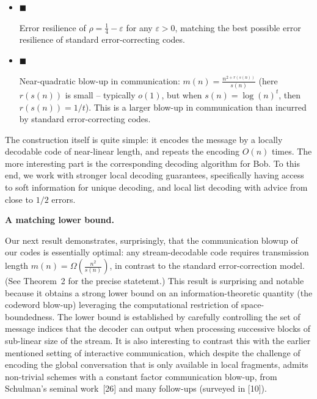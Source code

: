 \begin{itemize}


\item[] 
$\blacksquare$ 


Error resilience of $\rho=\frac{1}{4}-\varepsilon$ for any $\varepsilon>0$, matching the best possible error resilience of standard error-correcting codes.\par





\item[] 
$\blacksquare$ 


Near-quadratic blow-up in communication: $m(n)=\frac{n^{2+r(s(n))}}{s(n)}$ (here $r(s(n))$ is small – typically $o(1)$, but when $s(n)=\log(n)^{t}$, then $r(s(n))=1/t$). This is a larger blow-up in communication than incurred by standard error-correcting codes.\par





\end{itemize}


The construction itself is quite simple: it encodes the message by a locally decodable code of near-linear length, and repeats the encoding $O(n)$ times. The more interesting part is the corresponding decoding algorithm for Bob. To this end, we work with stronger local decoding guarantees, specifically having access to soft information for unique decoding, and local list decoding with advice from close to $1/2$ errors.\par





\par\medskip\noindent\textbf{A matching lower bound.}\par




Our next result demonstrates, surprisingly, that the communication blowup of our codes is essentially optimal: any stream-decodable code requires transmission length $m(n)=\Omega\left(\frac{n^{2}}{s(n)}\right)$, in contrast to the standard error-correction model. (See Theorem 2 for the precise statetemt.) This result is surprising and notable because it obtains a strong lower bound on an information-theoretic quantity (the codeword blow-up) leveraging the computational restriction of space-boundedness. The lower bound is established by carefully controlling the set of message indices that the decoder can output when processing successive blocks of sub-linear size of the stream. It is also interesting to contrast this with the earlier mentioned setting of interactive communication, which despite the challenge of encoding the global conversation that is only available in local fragments, admits non-trivial schemes with a constant factor communication blow-up, from Schulman’s seminal work [26] and many follow-ups (surveyed in [10]).\par





